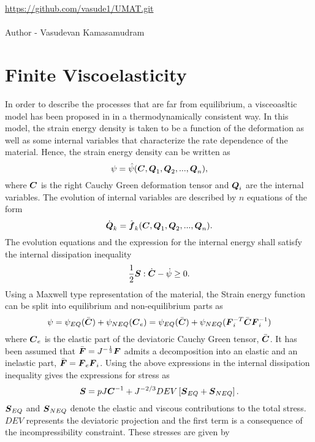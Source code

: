 \documentclass[11pt,twoside,TimesRoman]{article}
\author{Vasudevan }
\begin{document}
\href{https://github.com/vasude1/UMAT.git}{https://github.com/vasude1/UMAT.git}\\
\\
Author - Vasudevan Kamasamudram
\section{Finite Viscoelasticity}
In order to describe the processes that are far from equilibrium, a visceoasltic model has been proposed in \cite{Bergstrom1998, Reese1998} in a thermodynamically consistent way. In this model, the strain energy density is taken to be a function of the deformation as well as some internal variables that characterize the rate dependence of the material. Hence, the strain energy density can be written as 
\begin{equation}
\psi = \hat{\psi}(\mbox{\boldmath $C$},\mbox{\boldmath $Q$}_1,\mbox{\boldmath $Q$}_2,...,\mbox{\boldmath $Q$}_n),
\end{equation}
where $\mbox{\boldmath $C$}$ is the right Cauchy Green deformation tensor and $\mbox{\boldmath $Q$}_i$ are the internal variables. The evolution of internal variables are described by $n$ equations of the form
\begin{equation}
\dot{\mbox{\boldmath $Q$}}_k = \hat{\mbox{\boldmath $f$}}_k(\mbox{\boldmath $C$},\mbox{\boldmath $Q$}_1,\mbox{\boldmath $Q$}_2,...,\mbox{\boldmath $Q$}_n).
\end{equation}
The evolution equations and the expression for the internal energy shall satisfy the internal dissipation inequality 
\begin{equation}
\frac{1}{2}\mbox{\boldmath $S$}:\dot{\mbox{\boldmath $C$}} - \dot{\psi} \geq 0.
\end{equation}
Using a Maxwell type representation of the material, the Strain energy function can be split into equilibrium and non-equilibrium parts as
\begin{equation}
\psi = {\psi}_{EQ} (\bar{\mbox{\boldmath $C$}}) + {\psi}_{NEQ}(\mbox{\boldmath $C$}_e) = {\psi}_{EQ} (\bar{\mbox{\boldmath $C$}}) + {\psi}_{NEQ}(\mbox{\boldmath $F$}_i^{-T}\bar{\mbox{\boldmath $C$}} \mbox{\boldmath $F$}_i^{-1} )
\end{equation}
where $\mbox{\boldmath $C$}_e$ is the elastic part of the deviatoric Cauchy Green tensor, $\bar{\mbox{\boldmath $C$}}$. It has been assumed that $\bar{\mbox{\boldmath $F$}} = J^{-\frac{1}{3}} \mbox{\boldmath $F$}$ admits a decomposition into an elastic and an inelastic part, $\bar{\mbox{\boldmath $F$}} = \mbox{\boldmath $F$}_e \mbox{\boldmath $F$}_i$.
Using the above expressions in the internal dissipation inequality gives the expressions for stress as 
\begin{equation}
\mbox{\boldmath $S$} = pJ\mbox{\boldmath $C$}^{-1} + J^{-2/3}DEV\left[\mbox{\boldmath $S$}_{EQ} + \mbox{\boldmath $S$}_{NEQ} \right].
\end{equation}
$\mbox{\boldmath $S$}_{EQ}$ and $\mbox{\boldmath $S$}_{NEQ}$ denote the elastic and viscous contributions to the total stress. $DEV$ represents the deviatoric projection and the first term is a consequence of the incompressibility constraint. These stresses are given by  
\end{document}
